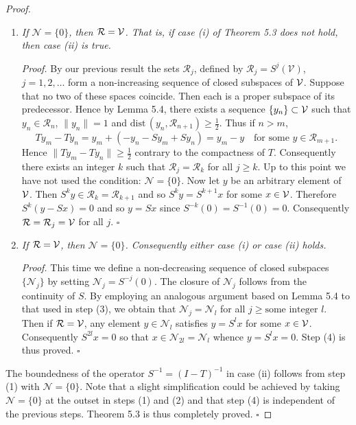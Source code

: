 \begin{proof}
\begin{enumerate}
\item[(3)] \textit{If $\mathcal N=\{0\}$, then $\mathcal R=\mathcal{V}$. That is, if case (i) of Theorem 5.3 does not hold, then case (ii) is true.}

\textit{Proof.} By our previous result the sets $\mathcal R_j$, defined by $\mathcal R_j=S^j(\mathcal V)$, $j=1,2,\dots$ form a non-increasing sequence of closed subspaces of $\mathcal{V}$. Suppose that no two of these spaces coincide. Then each is a proper subspace of its predecessor. Hence by Lemma 5.4, there exists a sequence $\{y_n\}\subset \mathcal{V}$ such that $y_n\in \mathcal R_n$, $\|y_n\|=1$ and $\mathrm{dist}\,(y_n,\mathcal R_{n+1})\geq \frac12$. Thus if $n>m$,
\[
T y_m - T y_n = y_m + (-y_n - S y_m + S y_n)
= y_m - y \quad \text{for some } y\in \mathcal R_{m+1}.
\]
Hence $\|T y_m - T y_n\|\geq \frac12$ contrary to the compactness of $T$. Consequently there exists an integer $k$ such that $\mathcal R_j=\mathcal R_k$ for all $j\geq k$. Up to this point we have not used the condition: $\mathcal N=\{0\}$. Now let $y$ be an arbitrary element of $\mathcal{V}$. Then $S^k y\in \mathcal R_k=\mathcal R_{k+1}$ and so $S^k y=S^{k+1}x$ for some $x\in \mathcal{V}$. Therefore $S^k(y-Sx)=0$ and so $y=Sx$ since $S^{-k}(0)=S^{-1}(0)=0$. Consequently $\mathcal R=\mathcal R_j=\mathcal{V}$ for all $j$. $\square$

\item[(4)] \textit{If $\mathcal R=\mathcal{V}$, then $\mathcal N=\{0\}$. Consequently either case (i) or case (ii) holds.}

\textit{Proof.} This time we define a non-decreasing sequence of closed subspaces $\{\mathcal N_j\}$ by setting $\mathcal N_j=S^{-j}(0)$. The closure of $\mathcal N_j$ follows from the continuity of $S$. By employing an analogous argument based on Lemma 5.4 to that used in step (3), we obtain that $\mathcal N_j=\mathcal N_l$ for all $j\geq \text{some integer } l$. Then if $\mathcal R=\mathcal{V}$, any element $y\in \mathcal N_l$ satisfies $y=S^l x$ for some $x\in \mathcal{V}$. Consequently $S^{2l}x=0$ so that $x\in \mathcal N_{2l}=\mathcal N_l$ whence $y=S^l x=0$. Step (4) is thus proved. $\square$
\end{enumerate}

The boundedness of the operator $S^{-1}=(I-T)^{-1}$ in case (ii) follows from step (1) with $\mathcal N=\{0\}$. Note that a slight simplification could be achieved by taking $\mathcal N=\{0\}$ at the outset in steps (1) and (2) and that step (4) is independent of the previous steps. Theorem 5.3 is thus completely proved. $\square$
\end{proof}

